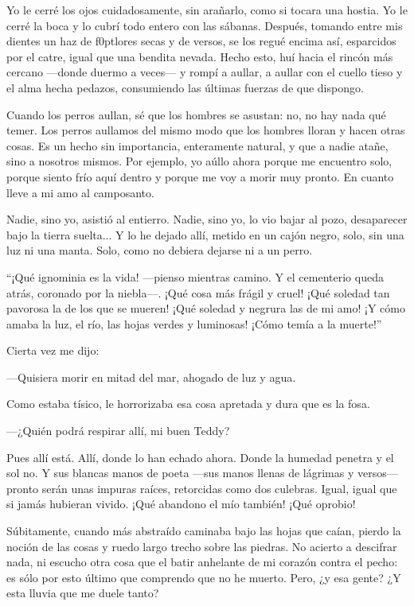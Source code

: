 \documentclass[14pt,a5paper,oneside,final]{extbook}
\begin{document}
Yo le cerré los ojos cuidadosamente, sin arañarlo, como si tocara una hostia. Yo le cerré la boca y lo cubrí todo entero con las sábanas. Después, tomando entre mis dientes un haz de f\kern0ptlores secas y de versos, se los regué encima así, esparcidos por el catre, igual que una bendita nevada. Hecho esto, huí hacia el rincón más cercano ---donde duermo a veces--- y rompí a aullar, a aullar con el cuello tieso y el alma hecha pedazos, consumiendo las últimas fuerzas de que dispongo.

Cuando los perros aullan, sé que los hombres se asustan: no, no hay nada qué temer. Los perros aullamos del mismo modo que los hombres lloran y hacen otras cosas. Es un hecho sin importancia, enteramente natural, y que a nadie atañe, sino a nosotros mismos. Por ejemplo, yo aúllo ahora porque me encuentro solo, porque siento frío aquí dentro y porque me voy a morir muy pronto. En cuanto lleve a mi amo al camposanto.

Nadie, sino yo, asistió al entierro. Nadie, sino yo, lo vio bajar al pozo, desaparecer bajo la tierra suelta... Y lo he dejado allí, metido en un cajón negro, solo, sin una luz ni una manta. Solo, como no debiera dejarse ni a un perro.

``¡Qué ignominia es la vida! —pienso mientras camino. Y el cementerio queda atrás, coronado por la niebla—. ¡Qué cosa más frágil y cruel! ¡Qué soledad tan pavorosa la de los que se mueren! ¡Qué soledad y negrura las de mi amo! ¡Y cómo amaba la luz, el río, las hojas verdes y luminosas! ¡Cómo temía a la muerte!''

Cierta vez me dijo:

---Quisiera morir en mitad del mar, ahogado de luz y agua.

Como estaba tísico, le horrorizaba esa cosa apretada y dura que es la fosa.

---¿Quién podrá respirar allí, mi buen Teddy?

Pues allí está. Allí, donde lo han echado ahora. Donde la humedad penetra y el sol no. Y sus blancas manos de poeta —sus manos llenas de lágrimas y versos— pronto serán unas impuras raíces, retorcidas como dos culebras. Igual, igual que si jamás hubieran vivido. ¡Qué abandono el mío también! ¡Qué oprobio!

Súbitamente, cuando más abstraído caminaba bajo las hojas que caían, pierdo la noción de las cosas y ruedo largo trecho sobre las piedras. No acierto a descifrar nada, ni escucho otra cosa que el batir anhelante de mi corazón contra el pecho: es sólo por esto último que comprendo que no he muerto. Pero, ¿y esa gente? ¿Y esta lluvia que me duele tanto?
\end{document}
